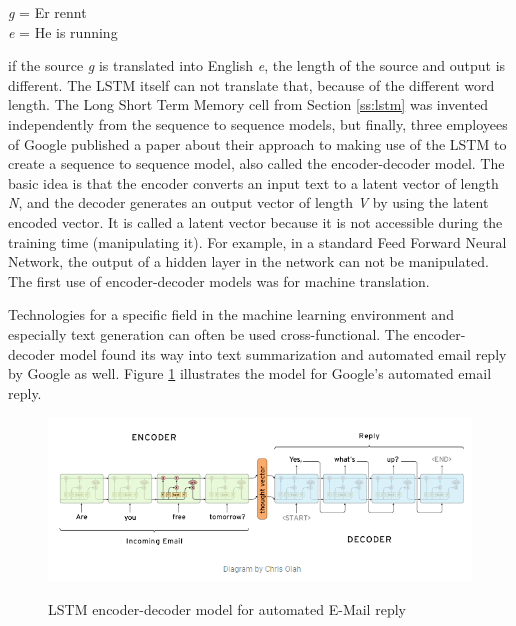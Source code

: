 \begin{tcolorbox}
	\textit{g} = Er rennt \\
	\textit{e} = He is running 
\end{tcolorbox}

if the source \textit{g} is translated into English \textit{e}, the length of the source and output is different.
The LSTM itself can not translate that, because of the different word length. 
The Long Short Term Memory cell from Section \ref{ss:lstm} was invented independently from the sequence to sequence models, but
finally, three employees of Google published a paper about their approach to making use of the LSTM to create a sequence to sequence model, also called the encoder-decoder model.
The basic idea is that the encoder converts an input text to a latent vector of length \textit{N}, and the decoder generates an output vector of length \textit{V} by using the latent encoded vector. It is called a latent vector because it is not accessible during the training time (manipulating it). For example, in a standard Feed Forward Neural Network, the output of a hidden layer in the network can not be manipulated. The first use of encoder-decoder models was for machine translation.

Technologies for a specific field in the machine learning environment and especially text generation can often be used cross-functional. The encoder-decoder model found its way into text summarization and automated email reply by Google \cite{google} as well. Figure \ref{enc-dec} illustrates the model for Google's automated email reply.

\begin{figure}
	\begin{center}
		\includegraphics[width=5.5in]{photos/encoder_decoder}\\
		\caption{LSTM encoder-decoder model for automated E-Mail reply}\label{enc-dec}
	\end{center}
\end{figure}

